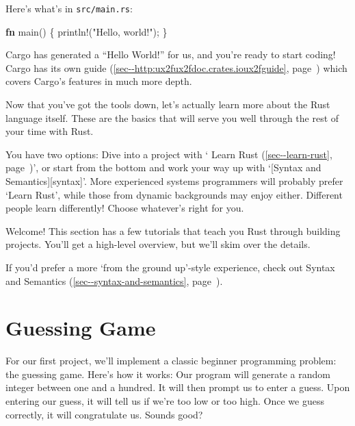 \documentclass[a4paper,]{book}
\renewcommand*{\hyperref}[2][\ar]{%
  \def\ar{#2}%
  #2 (\autoref{#1}, page~\pageref{#1})}
\newenvironment{Shaded}{\begin{snugshade}}{\end{snugshade}}
\newcommand{\KeywordTok}[1]{\textcolor[rgb]{0.13,0.29,0.53}{\textbf{{#1}}}}
\newcommand{\StringTok}[1]{\textcolor[rgb]{0.31,0.60,0.02}{{#1}}}
\newcommand{\OtherTok}[1]{\textcolor[rgb]{0.56,0.35,0.01}{{#1}}}
\newcommand{\NormalTok}[1]{{#1}}
\begin{document}
Here's what's in \texttt{src/main.rs}:

\begin{Shaded}
\begin{Highlighting}[]
\KeywordTok{fn} \NormalTok{main() \{}
    \OtherTok{println!}\NormalTok{(}\StringTok{"Hello, world!"}\NormalTok{);}
\NormalTok{\}}
\end{Highlighting}
\end{Shaded}

Cargo has generated a ``Hello World!'' for us, and you're ready to start
coding! Cargo has its own
\hyperref[sec--http:ux2fux2fdoc.crates.ioux2fguide]{guide} which covers
Cargo's features in much more depth.

Now that you've got the tools down, let's actually learn more about the
Rust language itself. These are the basics that will serve you well
through the rest of your time with Rust.

You have two options: Dive into a project with
`\hyperref[sec--learn-rust]{Learn Rust}', or start from the bottom and
work your way up with `{[}Syntax and Semantics{]}{[}syntax{]}'. More
experienced systems programmers will probably prefer `Learn Rust', while
those from dynamic backgrounds may enjoy either. Different people learn
differently! Choose whatever's right for you.


Welcome! This section has a few tutorials that teach you Rust through
building projects. You'll get a high-level overview, but we'll skim over
the details.

If you'd prefer a more `from the ground up'-style experience, check out
\hyperref[sec--syntax-and-semantics]{Syntax and Semantics}.

\section{Guessing Game}\label{sec--guessing-game}

For our first project, we'll implement a classic beginner programming
problem: the guessing game. Here's how it works: Our program will
generate a random integer between one and a hundred. It will then prompt
us to enter a guess. Upon entering our guess, it will tell us if we're
too low or too high. Once we guess correctly, it will congratulate us.
Sounds good?
\end{document}
